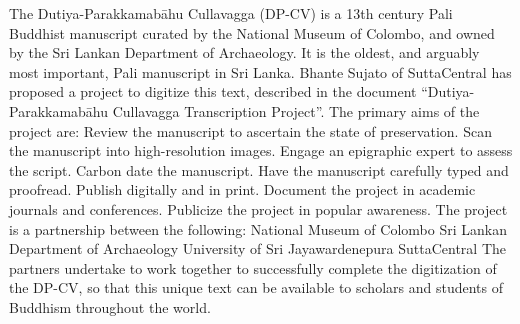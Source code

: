 The Dutiya-Parakkamabāhu Cullavagga (DP-CV) is a 13th century Pali Buddhist manuscript curated by the National Museum of Colombo, and owned by the Sri Lankan Department of Archaeology. It is the oldest, and arguably most important, Pali manuscript in Sri Lanka.\markdownRendererInterblockSeparator
{}Bhante Sujato of SuttaCentral has proposed a project to digitize this text, described in the document “Dutiya-Parakkamabāhu Cullavagga Transcription Project”. The primary aims of the project are:\markdownRendererInterblockSeparator
{}\markdownRendererUlBegin
\markdownRendererUlItem Review the manuscript to ascertain the state of preservation.\markdownRendererUlItemEnd 
\markdownRendererUlItem Scan the manuscript into high-resolution images.\markdownRendererUlItemEnd 
\markdownRendererUlItem Engage an epigraphic expert to assess the script.\markdownRendererUlItemEnd 
\markdownRendererUlItem Carbon date the manuscript.\markdownRendererUlItemEnd 
\markdownRendererUlItem Have the manuscript carefully typed and proofread.\markdownRendererUlItemEnd 
\markdownRendererUlItem Publish digitally and in print.\markdownRendererUlItemEnd 
\markdownRendererUlItem Document the project in academic journals and conferences.\markdownRendererUlItemEnd 
\markdownRendererUlItem Publicize the project in popular awareness.\markdownRendererUlItemEnd 
\markdownRendererUlEnd \markdownRendererInterblockSeparator
{}The project is a partnership between the following:\markdownRendererInterblockSeparator
{}\markdownRendererUlBegin
\markdownRendererUlItem National Museum of Colombo\markdownRendererUlItemEnd 
\markdownRendererUlItem Sri Lankan Department of Archaeology\markdownRendererUlItemEnd 
\markdownRendererUlItem University of Sri Jayawardenepura\markdownRendererUlItemEnd 
\markdownRendererUlItem SuttaCentral\markdownRendererUlItemEnd 
\markdownRendererUlEnd \markdownRendererInterblockSeparator
{}The partners undertake to work together to successfully complete the digitization of the DP-CV, so that this unique text can be available to scholars and students of Buddhism throughout the world.\relax